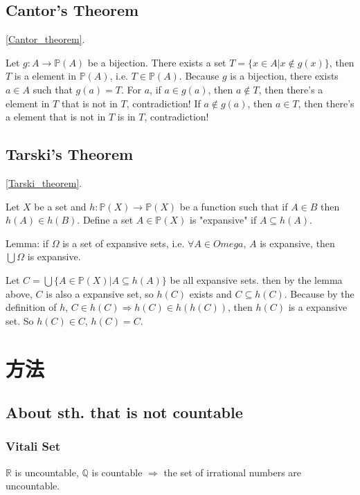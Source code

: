 \documentclass[12pt,a4paper]{ctexrep}
\begin{document}
\subsection{Cantor's Theorem}\label{Cantor_proof}
\hyperlink{Cantor_theorem}{\ref{Cantor_theorem}}. \hypertarget{Cantor_proof}{}

Let $g: A \rightarrow \mathbb{P}(A)$ be a bijection. There exists a set $T=\{x \in A| x \notin g(x)\}$, then $T$ is a element in $\mathbb{P}(A)$, i.e. $T \in \mathbb{P}(A)$. Because $g$ is a bijection, there exists $a\in A$ such that $g(a)=T$. For $a$, if $a \in g(a)$, then $a \notin T$, then there's a element in $T$ that is not in $T$, contradiction! If $a \notin g(a)$, then $a \in T$, then there's a element that is not in $T$ is in $T$, contradiction!

\subsection{Tarski's Theorem}\label{Tarski_proof}
\hyperlink{Tarski_theorem}{\ref{Tarski_theorem}}. \hypertarget{Tarski_proof}{}

Let $X$ be a set and $h: \mathbb{P}(X) \rightarrow \mathbb{P}(X)$ be a function such that if $A \in B$ then $h(A) \in h(B)$. Define a set $A \in \mathbb{P}(X)$ is "expansive" if $A \subseteq h(A)$.

Lemma: if $\Omega$ is a set of expansive sets, i.e. $\forall A \in Omega$, $A$ is expansive, then $\bigcup \Omega$ is expansive.

Let $C = \bigcup\{A\in \mathbb{P}(X)| A \subseteq h(A)\}$ be all expansive sets. then by the lemma above, $C$ is also a expansive set, so $h(C)$ exists and $C \subseteq h(C)$. Because by the definition of $h$, $C \in h(C) \Rightarrow h(C) \in h(h(C))$, then $h(C)$ is a expansive set. So $h(C) \in C$, $h(C) = C$.
\section{方法}
\subsection{About sth. that is not countable}
\subsubsection{Vitali Set}
$\mathbb{R}$ is uncountable, $\mathbb{Q}$ is countable $\Rightarrow$ the set of irrational numbers are uncountable.
\end{document}
